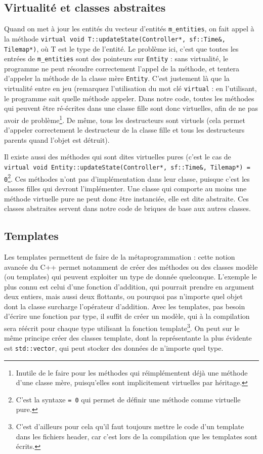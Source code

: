\documentclass[a4paper,10pt]{report}
\begin{document}
\subsection{Virtualité et classes abstraites}
Quand on met à jour les entités du vecteur d'entités \texttt{m\_entities}, on fait appel à la méthode \texttt{virtual void T::updateState(Controller*, sf::Time\&, Tilemap*)}, où T est le type de l'entité. Le problème ici, c'est que toutes les entrées de \texttt{m\_entities} sont des pointeurs sur \texttt{Entity} : sans virtualité, le programme ne peut résoudre correctement l'appel de la méthode, et tentera d'appeler la méthode de la classe mère \texttt{Entity}. C'est justement là que la virtualité entre en jeu (remarquez l'utilisation du mot clé \texttt{virtual} : en l'utilisant, le programme sait quelle méthode appeler. Dans notre code, toutes les méthodes qui peuvent être ré-écrites dans une classe fille sont donc virtuelles, afin de ne pas avoir de problème\footnote{Inutile de le faire pour les méthodes qui réimplémentent déjà une méthode d'une classe mère, puisqu'elles sont implicitement virtuelles par héritage.}. De même, tous les destructeurs sont virtuels (cela permet d'appeler correctement le destructeur de la classe fille et tous les destructeurs parents quand l'objet est détruit).

Il existe aussi des méthodes qui sont dites virtuelles pures (c'est le cas de \\\texttt{virtual void Entity::updateState(Controller*, sf::Time\&, Tilemap*) = 0}\footnote{C'est la syntaxe \texttt{= 0} qui permet de définir une méthode comme virtuelle pure.}. Ces méthodes n'ont pas d'implémentation dans leur classe, puisque c'est les classes filles qui devront l'implémenter. Une classe qui comporte au moins une méthode virtuelle pure ne peut donc être instanciée, elle est dite abstraite. Ces classes abstraites servent dans notre code de briques de base aux autres classes.
\subsection{Templates}
Les templates permettent de faire de la métaprogrammation : cette notion avancée du C++ permet notamment de créer des méthodes ou des classes modèle (ou templates) qui peuvent exploiter un type de donnée quelconque. L'exemple le plus connu est celui d'une fonction d'addition, qui pourrait prendre en argument deux entiers, mais aussi deux flottants, ou pourquoi pas n'importe quel objet dont la classe surcharge l'opérateur d'addition. Avec les templates, pas besoin d'écrire une fonction par type, il suffit de créer un modèle, qui à la compilation sera réécrit pour chaque type utilisant la fonction template\footnote{C'est d'ailleurs pour cela qu'il faut toujours mettre le code d'un template dans les fichiers header, car c'est lors de la compilation que les templates sont écrits.}. On peut sur le même principe créer des classes template, dont la représentante la plus évidente est \texttt{std::vector}, qui peut stocker des données de n'importe quel type.
\end{document}
